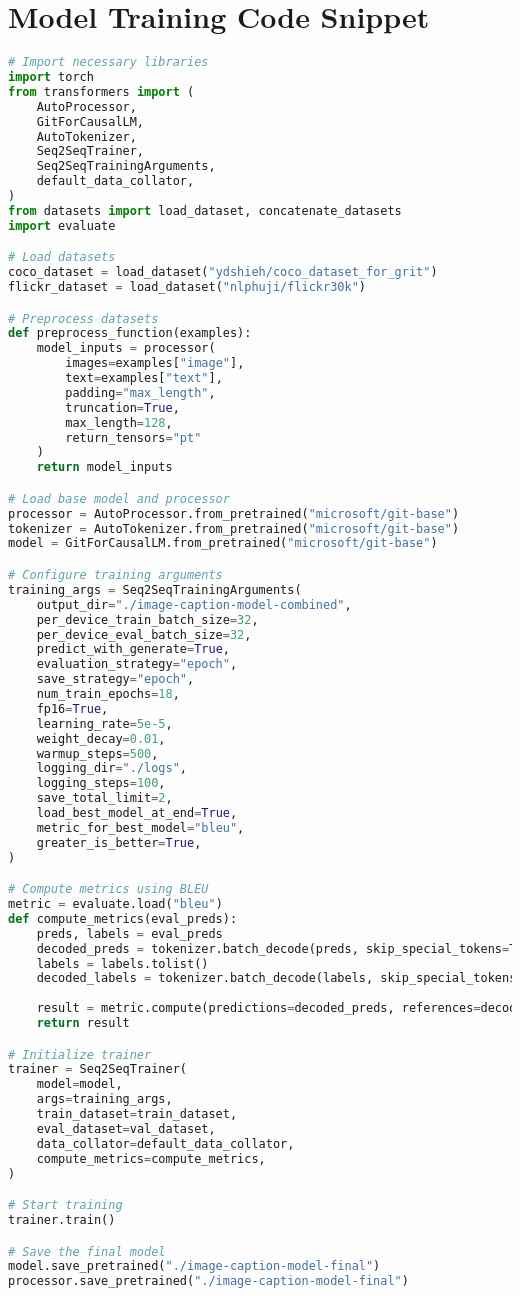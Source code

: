 \documentclass[12pt,a4paper]{report}
\begin{document}
\section{Model Training Code Snippet}
\begin{lstlisting}[language=python, caption=Model Training Code]
# Import necessary libraries
import torch
from transformers import (
    AutoProcessor,
    GitForCausalLM,
    AutoTokenizer,
    Seq2SeqTrainer,
    Seq2SeqTrainingArguments,
    default_data_collator,
)
from datasets import load_dataset, concatenate_datasets
import evaluate

# Load datasets
coco_dataset = load_dataset("ydshieh/coco_dataset_for_grit")
flickr_dataset = load_dataset("nlphuji/flickr30k")

# Preprocess datasets
def preprocess_function(examples):
    model_inputs = processor(
        images=examples["image"],
        text=examples["text"],
        padding="max_length",
        truncation=True,
        max_length=128,
        return_tensors="pt"
    )
    return model_inputs

# Load base model and processor
processor = AutoProcessor.from_pretrained("microsoft/git-base")
tokenizer = AutoTokenizer.from_pretrained("microsoft/git-base")
model = GitForCausalLM.from_pretrained("microsoft/git-base")

# Configure training arguments
training_args = Seq2SeqTrainingArguments(
    output_dir="./image-caption-model-combined",
    per_device_train_batch_size=32,
    per_device_eval_batch_size=32,
    predict_with_generate=True,
    evaluation_strategy="epoch",
    save_strategy="epoch",
    num_train_epochs=18,
    fp16=True,
    learning_rate=5e-5,
    weight_decay=0.01,
    warmup_steps=500,
    logging_dir="./logs",
    logging_steps=100,
    save_total_limit=2,
    load_best_model_at_end=True,
    metric_for_best_model="bleu",
    greater_is_better=True,
)

# Compute metrics using BLEU
metric = evaluate.load("bleu")
def compute_metrics(eval_preds):
    preds, labels = eval_preds
    decoded_preds = tokenizer.batch_decode(preds, skip_special_tokens=True)
    labels = labels.tolist()
    decoded_labels = tokenizer.batch_decode(labels, skip_special_tokens=True)
    
    result = metric.compute(predictions=decoded_preds, references=decoded_labels)
    return result

# Initialize trainer
trainer = Seq2SeqTrainer(
    model=model,
    args=training_args,
    train_dataset=train_dataset,
    eval_dataset=val_dataset,
    data_collator=default_data_collator,
    compute_metrics=compute_metrics,
)

# Start training
trainer.train()

# Save the final model
model.save_pretrained("./image-caption-model-final")
processor.save_pretrained("./image-caption-model-final")
\end{lstlisting}
\end{document}
